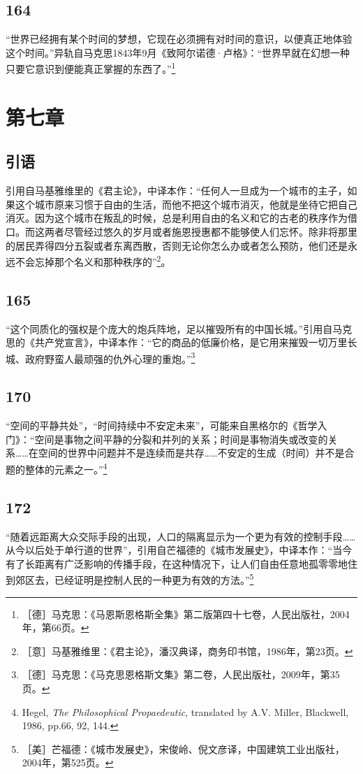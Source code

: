 \documentclass[fontset=fandol, a4paper, 12pt, openright]{ctexbook}
\begin{document}
\subsection*{164}
“世界已经拥有某个时间的梦想，它现在必须拥有对时间的意识，以便真正地体验这个时间。”异轨自马克思1843年9月《致阿尔诺德·卢格》：“世界早就在幻想一种只要它意识到便能真正掌握的东西了。”\footnote{［德］马克思：《马恩斯恩格斯全集》第二版第四十七卷，人民出版社，2004年，第66页。}

\section*{第七章}

\subsection*{引语}
引用自马基雅维里的《君主论》，中译本作：“任何人一旦成为一个城市的主子，如果这个城市原来习惯于自由的生活，而他不把这个城市消灭，他就是坐待它把自己消灭。因为这个城市在叛乱的时候，总是利用自由的名义和它的古老的秩序作为借口。而这两者尽管经过悠久的岁月或者施恩授惠都不能够使人们忘怀。除非将那里的居民弄得四分五裂或者东离西散，否则无论你怎么办或者怎么预防，他们还是永远不会忘掉那个名义和那种秩序的”\footnote{［意］马基雅维里：《君主论》，潘汉典译，商务印书馆，1986年，第23页。}。

\subsection*{165}
“这个同质化的强权是个庞大的炮兵阵地，足以摧毁所有的中国长城。”引用自马克思的《共产党宣言》，中译本作：“它的商品的低廉价格，是它用来摧毁一切万里长城、政府野蛮人最顽强的仇外心理的重炮。”\footnote{［德］马克思：《马克思恩格斯文集》第二卷，人民出版社，2009年，第35页。}

\subsection*{170}
“空间的平静共处”，“时间持续中不安定未来”，可能来自黑格尔的《哲学入门》：“空间是事物之间平静的分裂和并列的关系；时间是事物消失或改变的关系……在空间的世界中问题并不是连续而是共存……不安定的生成（时间）并不是合题的整体的元素之一。”\footnote{Hegel, \textit{The Philosophical Propaedeutic}, translated by A.V. Miller, Blackwell, 1986, pp.66, 92, 144.}

\subsection*{172}
“随着远距离大众交际手段的出现，人口的隔离显示为一个更为有效的控制手段……从今以后处于单行道的世界”，引用自芒福德的《城市发展史》，中译本作：“当今有了长距离有广泛影响的传播手段，在这种情况下，让人们自由任意地孤零零地住到郊区去，已经证明是控制人民的一种更为有效的方法。”\footnote{［美］芒福德：《城市发展史》，宋俊岭、倪文彦译，中国建筑工业出版社，2004年，第525页。}
\end{document}
